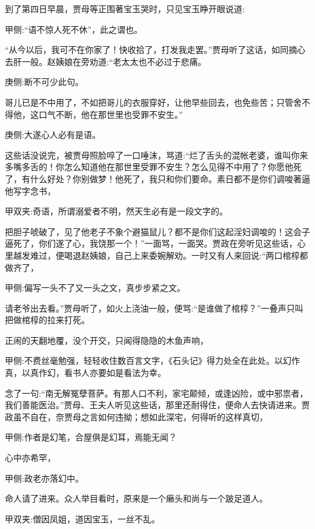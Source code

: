 \begin{parag}
    到了第四日早晨，贾母等正围著宝玉哭时，只见宝玉睁开眼说道:\begin{note}甲侧:“语不惊人死不休”，此之谓也。\end{note}“从今以后，我可不在你家了！快收拾了，打发我走罢。”贾母听了这话，如同摘心去肝一般。赵姨娘在旁劝道:“老太太也不必过于悲痛。\begin{note}庚侧:断不可少此句。\end{note}哥儿已是不中用了，不如把哥儿的衣服穿好，让他早些回去，也免些苦；只管舍不得他，这口气不断，他在那世里也受罪不安生。”\begin{note}庚侧:大遂心人必有是语。\end{note}这些话没说完，被贾母照脸啐了一口唾沫，骂道:“烂了舌头的混帐老婆，谁叫你来多嘴多舌的！你怎么知道他在那世里受罪不安生？怎么见得不中用了？你愿他死了，有什么好处？你别做梦！他死了，我只和你们要命。素日都不是你们调唆著逼他写字念书，\begin{note}甲双夹:奇语，所谓溺爱者不明，然天生必有是一段文字的。\end{note}把胆子唬破了，见了他老子不象个避猫鼠儿？都不是你们这起淫妇调唆的！这会子逼死了，你们遂了心，我饶那一个！”一面骂，一面哭。贾政在旁听见这些话，心里越发难过，便喝退赵姨娘，自己上来委婉解劝。一时又有人来回说:“两口棺椁都做齐了，\begin{note}甲侧:偏写一头不了又一头之文，真步步紧之文。\end{note}请老爷出去看。”贾母听了，如火上浇油一般，便骂:“是谁做了棺椁？”一叠声只叫把做棺椁的拉来打死。
\end{parag}


\begin{parag}
    正闹的天翻地覆，没个开交，只闻得隐隐的木鱼声响，\begin{note}甲侧:不费丝毫勉强，轻轻收住数百言文字，《石头记》得力处全在此处。以幻作真，以真作幻，看书人亦要如是看法为幸。\end{note}念了一句:“南无解冤孽菩萨。有那人口不利，家宅颠倾，或逢凶险，或中邪祟者，我们善能医治。”贾母、王夫人听见这些话，那里还耐得住，便命人去快请进来。贾政虽不自在，奈贾母之言如何违拗；想如此深宅，何得听的这样真切，\begin{note}甲侧:作者是幻笔，合屋俱是幻耳，焉能无闻？\end{note}心中亦希罕，\begin{note}甲侧:政老亦落幻中。\end{note}命人请了进来。众人举目看时，原来是一个癞头和尚与一个跛足道人。\begin{note}甲双夹:僧因凤姐，道因宝玉，一丝不乱。\end{note}
\end{parag}


